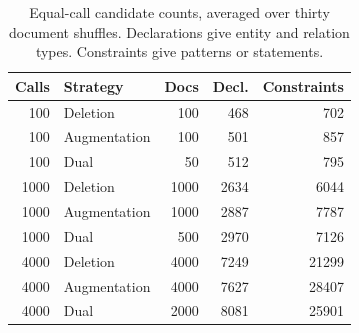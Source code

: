 \begin{table}[t]
\centering
\caption{Equal-call candidate counts, averaged over thirty document shuffles. Declarations give entity and relation types. Constraints give patterns or statements.}
\label{tab:equal_budget}
\footnotesize
\setlength{\tabcolsep}{3pt}
\begin{tabular*}{\columnwidth}{@{\extracolsep{\fill}}rlrrr@{}}
\toprule
Calls & Strategy & Docs & Decl. & Constraints \\
\midrule
100 & Deletion & 100 & 468 & 702 \\
100 & Augmentation & 100 & 501 & 857 \\
100 & Dual & 50 & 512 & 795 \\
1000 & Deletion & 1000 & 2634 & 6044 \\
1000 & Augmentation & 1000 & 2887 & 7787 \\
1000 & Dual & 500 & 2970 & 7126 \\
4000 & Deletion & 4000 & 7249 & 21299 \\
4000 & Augmentation & 4000 & 7627 & 28407 \\
4000 & Dual & 2000 & 8081 & 25901 \\
\bottomrule
\end{tabular*}
\end{table}
